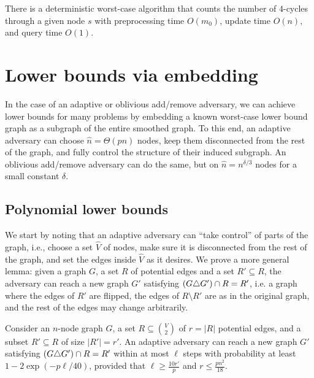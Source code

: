 \documentclass[letter,11pt]{article}
\begin{document}
\begin{corollary}
\label{cor:counting s 4cycles worst-case}
	There is a deterministic worst-case algorithm
	that counts the number of $4$-cycles through a given node $s$ with preprocessing time $O(m_0)$, 
	update time $O(n)$, 
	and query time $O(1)$.  
\end{corollary}


\section{Lower bounds via embedding}
\label{sec:lb with embedding}

In the case of an adaptive or oblivious add/remove adversary, 
we can achieve lower bounds for many problems by embedding a known worst-case lower bound graph as a subgraph of the entire smoothed graph.
To this end, an adaptive adversary can choose $\hat n=\Theta(pn)$ nodes, 
keep them disconnected from the rest of the graph, and fully control the structure of their induced subgraph. 
An oblivious add/remove adversary can do the same, but on $\hat n=n^{\delta/3}$ nodes for a small constant $\delta$.

\subsection{Polynomial lower bounds}
\label{sec:poly lbs}

We start by noting that an adaptive adversary can ``take control'' of parts of the graph,
i.e., choose a set $\hat V$ of nodes,
make sure it is disconnected from the rest of the graph,
and set the edges inside $\hat V$ as it desires.
We prove a more general lemma:
given a graph $G$, a set $R$ of potential edges and a set $R'\subseteq R$,
the adversary can reach a new graph $G'$ satisfying $(G\triangle G')\cap R=R'$, i.e. a graph 
where the edges of $R'$ are flipped, 
the edges of $R\setminus R'$ are as in the original graph,
and the rest of the edges may change arbitrarily.


\begin{lemma}
	\label{lem:edge control adaptive}
	Consider an $n$-node graph $G$, a set $R\subseteq \binom{V}{2}$ of $r=|R|$ potential edges,
	and a subset $R'\subseteq R$ of size $|R'|= r'$.
	An adaptive adversary can reach a new graph $G'$ satisfying 
	$(G\triangle G')\cap R=R'$
	within at most 
    $\ell$ steps with probability at least
    $1 - 2\exp\left( -p \ell /40\right)$, provided that
    $\ell \geq \frac{10r'}{p}$  
    and
    $r\leq\frac{pn^2}{18}$.
\end{lemma}
\end{document}
